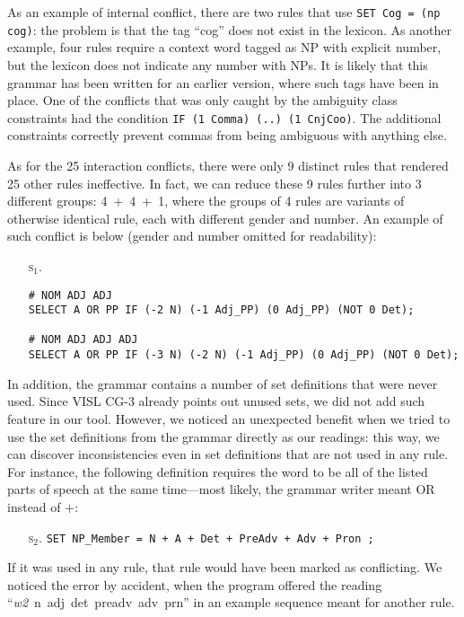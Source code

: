 {{As an example of internal conflict, there are two rules that use \texttt{SET Cog = (np cog)}: the problem is that the tag ``cog'' does not exist in the lexicon. As another example, four rules require a context word tagged as NP with explicit number, but the lexicon does not indicate any number with NPs. It is likely that this grammar has been written for an earlier version, where such tags have been in place.
One of the conflicts that was only caught by the ambiguity class constraints had the condition \texttt{IF (1 Comma) (..) (1 CnjCoo)}. The additional constraints correctly prevent commas from being ambiguous with anything else.

As for the 25 interaction conflicts, there were only 9 distinct rules that rendered 25 other rules ineffective.
In fact, we can reduce these 9 rules further into 3 different groups: 4~+~4~+~1, where the groups of 4 rules are variants of otherwise identical rule, each with different gender and number.
An example of such conflict is below (gender and number omitted for readability):

\begin{itemize}
\item[\textsc{s$_{1}$.}] 
\begin{verbatim}
# NOM ADJ ADJ
SELECT A OR PP IF (-2 N) (-1 Adj_PP) (0 Adj_PP) (NOT 0 Det);

# NOM ADJ ADJ ADJ
SELECT A OR PP IF (-3 N) (-2 N) (-1 Adj_PP) (0 Adj_PP) (NOT 0 Det);
\end{verbatim}
\end{itemize}


In addition, the grammar contains a number of set definitions that were never
used. Since VISL CG-3 already points out unused sets, we did not add such
feature in our tool. However, we noticed an unexpected benefit when
we tried to use the set definitions from the grammar directly as our
readings: this way, we can discover inconsistencies even in
set definitions that are not used in any rule.
For instance, the following definition requires the word to be all of
the listed parts of speech at the same time---most likely, the grammar writer meant 
OR instead of +:
\begin{itemize}
\item[\textsc{s$_2$.}] 
\texttt{SET NP\_Member = N + A + Det + PreAdv + Adv + Pron ;}
\end{itemize}

If it was used in any rule, that rule would have been marked as
conflicting. We noticed the error by accident, when the program
offered the reading ``\emph{w2}~n~adj~det~preadv~adv~prn''
in an example sequence meant for another rule.


}}
